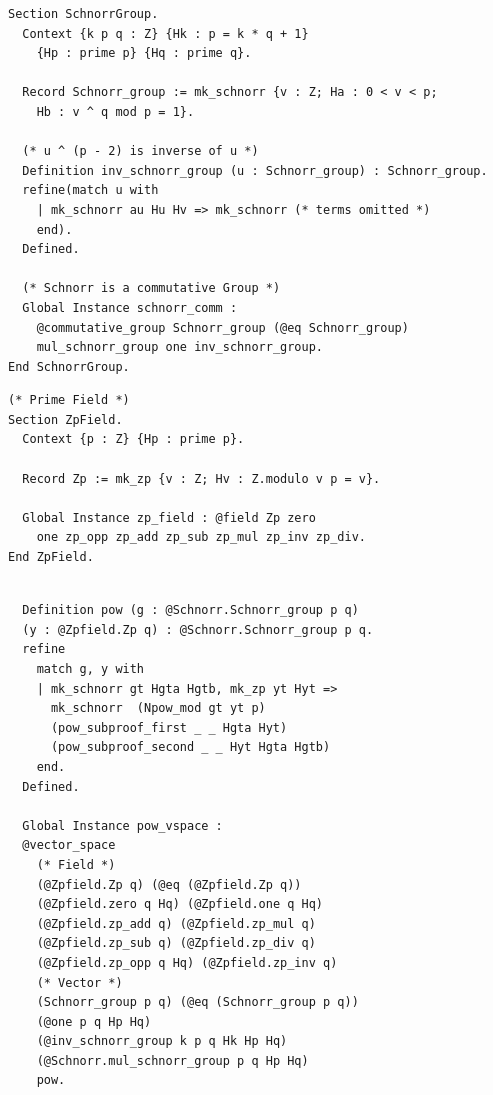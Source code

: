 \documentclass[sigconf,anonymous,review]{acmart}
\begin{document}
\begin{lstlisting}[frame=single, language=Coq, caption={Rocq Encoding of the Schnorr Group},
  label={group_def},captionpos=t, basicstyle=\ttfamily\footnotesize,
  abovecaptionskip=-\medskipamount]
Section SchnorrGroup. 
  Context {k p q : Z} {Hk : p = k * q + 1}
    {Hp : prime p} {Hq : prime q}.

  Record Schnorr_group := mk_schnorr {v : Z; Ha : 0 < v < p; 
    Hb : v ^ q mod p = 1}.

  (* u ^ (p - 2) is inverse of u *)
  Definition inv_schnorr_group (u : Schnorr_group) : Schnorr_group.
  refine(match u with 
    | mk_schnorr au Hu Hv => mk_schnorr (* terms omitted *)
    end).
  Defined.

  (* Schnorr is a commutative Group *)
  Global Instance schnorr_comm : 
    @commutative_group Schnorr_group (@eq Schnorr_group) 
    mul_schnorr_group one inv_schnorr_group.
End SchnorrGroup.
\end{lstlisting}

\begin{lstlisting}[frame=single, language=Coq, caption={Rocq Encoding of Prime Field},
  label={field_def},captionpos=t, basicstyle=\ttfamily\footnotesize,
  abovecaptionskip=-\medskipamount]
(* Prime Field *)
Section ZpField.
  Context {p : Z} {Hp : prime p}.

  Record Zp := mk_zp {v : Z; Hv : Z.modulo v p = v}.

  Global Instance zp_field : @field Zp zero 
    one zp_opp zp_add zp_sub zp_mul zp_inv zp_div.
End ZpField. 
\end{lstlisting}

\begin{lstlisting}[frame=single, language=Coq, caption={Vector Space Instantiation},
  label={vec_space},captionpos=t, basicstyle=\ttfamily\footnotesize,
  abovecaptionskip=-\medskipamount]

  Definition pow (g : @Schnorr.Schnorr_group p q) 
  (y : @Zpfield.Zp q) : @Schnorr.Schnorr_group p q.
  refine 
    match g, y with 
    | mk_schnorr gt Hgta Hgtb, mk_zp yt Hyt => 
      mk_schnorr  (Npow_mod gt yt p) 
      (pow_subproof_first _ _ Hgta Hyt)
      (pow_subproof_second _ _ Hyt Hgta Hgtb)
    end.
  Defined.

  Global Instance pow_vspace : 
  @vector_space 
    (* Field *)
    (@Zpfield.Zp q) (@eq (@Zpfield.Zp q))
    (@Zpfield.zero q Hq) (@Zpfield.one q Hq)
    (@Zpfield.zp_add q) (@Zpfield.zp_mul q)
    (@Zpfield.zp_sub q) (@Zpfield.zp_div q)
    (@Zpfield.zp_opp q Hq) (@Zpfield.zp_inv q)
    (* Vector *)
    (Schnorr_group p q) (@eq (Schnorr_group p q))
    (@one p q Hp Hq) 
    (@inv_schnorr_group k p q Hk Hp Hq)
    (@Schnorr.mul_schnorr_group p q Hp Hq)
    pow.
  
\end{lstlisting}
\end{document}

